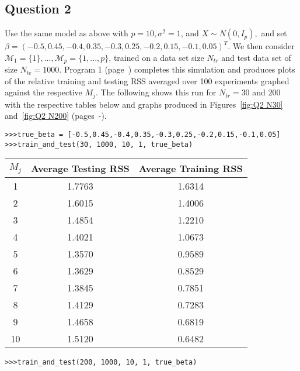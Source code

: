 \documentclass{article}
\begin{document}
\subsection{Question 2}
Use the same model as above with $p=10, \sigma^2=1$, and $X \sim N(0,I_p),$ and set $\beta = (-0.5,0.45,-0.4,0.35,-0.3,0.25,-0.2,0.15,-0.1,0.05)^T$. We then consider $\mathcal{M}_1=\{1\},...,\mathcal{M}_p=\{1,...,p\}$, trained on a data set size $N_{tr}$ and test data set of size $N_{te}=1000$. Program 1 (page~\pageref{subsec:Program 1}) completes this simulation and produces plots of the relative training and testing RSS averaged over 100 experiments graphed against the respective $M_j$. The following shows this run for $N_{tr}=30$ and $200$ with the respective tables below and graphs produced in Figures~\ref{fig:Q2 N30} and~\ref{fig:Q2 N200} (pages~\pageref{fig:Q2 N30}-\pageref{fig:Q2 N200}).

\begin{lstlisting}
>>>true_beta = [-0.5,0.45,-0.4,0.35,-0.3,0.25,-0.2,0.15,-0.1,0.05]
>>>train_and_test(30, 1000, 10, 1, true_beta)
\end{lstlisting}

\begin{center}
\begin{tabular}{ c | c c}
$M_j$ & Average Testing RSS & Average Training RSS \\
\hline
1 & 1.7763 & 1.6314 \\
2 & 1.6015 & 1.4006 \\
3 & 1.4854 & 1.2210 \\
4 & 1.4021 & 1.0673 \\
5 & 1.3570 & 0.9589 \\
6 & 1.3629 & 0.8529 \\
7 & 1.3845 & 0.7851 \\
8 & 1.4129 & 0.7283 \\
9 & 1.4658 & 0.6819 \\
10 & 1.5120 & 0.6482 \\
\end{tabular}
\end{center}

\begin{lstlisting}
>>>train_and_test(200, 1000, 10, 1, true_beta)
\end{lstlisting}
\end{document}
